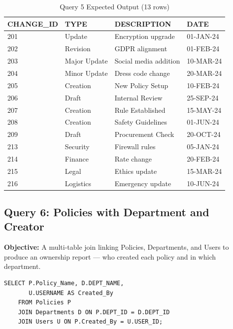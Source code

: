 \documentclass[conference]{IEEEtran}
\begin{document}
\begin{table}[H]
\centering
\caption{Query 5 Expected Output (13 rows)}
\begin{tabular}{|l|l|l|l|}
\hline
\textbf{CHANGE\_ID} & \textbf{TYPE} & \textbf{DESCRIPTION} & \textbf{DATE} \\
\hline
201 & Update       & Encryption upgrade      & 01-JAN-24 \\
202 & Revision     & GDPR alignment          & 01-FEB-24 \\
203 & Major Update & Social media addition   & 10-MAR-24 \\
204 & Minor Update & Dress code change       & 20-MAR-24 \\
205 & Creation     & New Policy Setup        & 10-FEB-24 \\
206 & Draft        & Internal Review         & 25-SEP-24 \\
207 & Creation     & Rule Established        & 15-MAY-24 \\
208 & Creation     & Safety Guidelines       & 01-JUN-24 \\
209 & Draft        & Procurement Check       & 20-OCT-24 \\
213 & Security     & Firewall rules          & 05-JAN-24 \\
214 & Finance      & Rate change             & 20-FEB-24 \\
215 & Legal        & Ethics update           & 15-MAR-24 \\
216 & Logistics    & Emergency update        & 10-JUN-24 \\
\hline
\end{tabular}
\end{table}

\subsection{Query 6: Policies with Department and Creator}

\textbf{Objective:} A multi-table join linking Policies, Departments, and Users to produce an ownership report — who created each policy and in which department.

\begin{lstlisting}[style=sqlstyle, caption={Query 6: Policy Ownership (Multi-JOIN)}]
SELECT P.Policy_Name, D.DEPT_NAME,
       U.USERNAME AS Created_By
    FROM Policies P
    JOIN Departments D ON P.DEPT_ID = D.DEPT_ID
    JOIN Users U ON P.Created_By = U.USER_ID;
\end{lstlisting}
\end{document}

